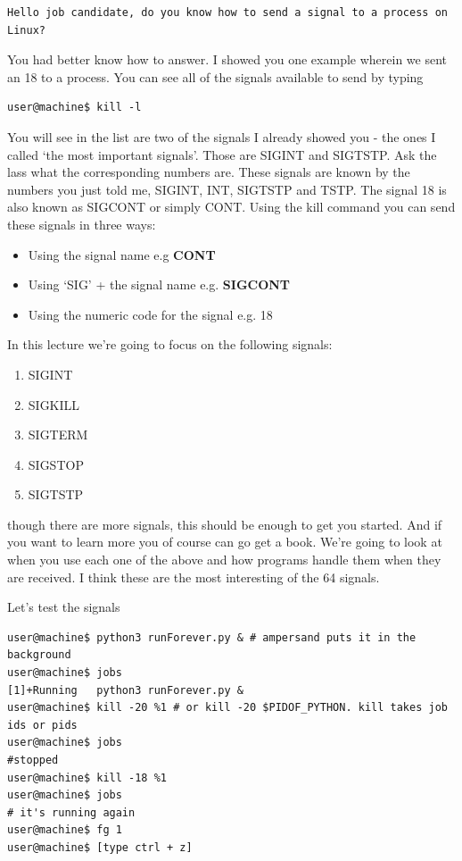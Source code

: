 \documentclass[12pt]{article}
\begin{document}
\begin{verbatim}
Hello job candidate, do you know how to send a signal to a process on Linux?
\end{verbatim}

You had better know how to answer. I showed you one example wherein we sent an 18 to a process. You can see all of the signals available to send by typing 

\begin{lstlisting}
user@machine$ kill -l
\end{lstlisting}

You will see in the list are two of the signals I already showed you - the ones
I called `the most important signals'. Those are SIGINT and  SIGTSTP. Ask the
lass what the corresponding numbers are. These signals are known by the numbers
you just told me, SIGINT, INT, SIGTSTP and TSTP. The signal
18 is also known as SIGCONT or simply CONT. 
Using the kill command you can send these signals in three ways:

\begin{itemize}
\item Using the signal name e.g \textbf{CONT}
\item Using `SIG' + the signal name e.g. \textbf{SIGCONT}
\item Using the numeric code for the signal e.g. 18
\end{itemize}

In this lecture we're going to focus on the following signals:

\begin{enumerate}
\item SIGINT
\item SIGKILL
\item SIGTERM
\item SIGSTOP
\item SIGTSTP
\end{enumerate}

though there are more signals, this should be enough to get you started. And if you want to learn more you of course can go get a book. We're going to look at when you use each one of the above and how programs handle them when they are received. I think these are the most interesting of the 64 signals.

Let's test the signals

\begin{lstlisting}
user@machine$ python3 runForever.py & # ampersand puts it in the background
user@machine$ jobs
[1]+Running   python3 runForever.py &
user@machine$ kill -20 %1 # or kill -20 $PIDOF_PYTHON. kill takes job ids or pids
user@machine$ jobs
#stopped
user@machine$ kill -18 %1
user@machine$ jobs
# it's running again
user@machine$ fg 1
user@machine$ [type ctrl + z]
\end{lstlisting}
\end{document}
